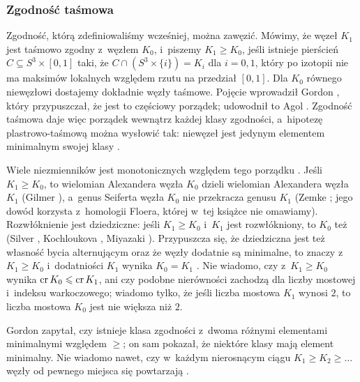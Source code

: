 \subsubsection{Zgodność taśmowa}
Zgodność, którą zdefiniowaliśmy wcześniej, można zawęzić.
Mówimy, że węzeł $K_1$ jest taśmowo zgodny z~węzłem $K_0$, i~piszemy $K_1 \geq K_0$, jeśli istnieje pierścień $C \subseteq S^3 \times [0, 1]$ taki, że $C \cap (S^3 \times \{i\}) = K_i$ dla $i = 0, 1$, który po izotopii nie ma maksimów lokalnych względem rzutu na przedział $[0, 1]$.
%
Dla $K_0$ równego niewęzłowi dostajemy dokładnie węzły taśmowe.
Pojęcie wprowadził Gordon \cite{gordon1981}, który przypuszczał, że jest to częściowy porządek; udowodnił to Agol \cite{agol2022}.
%
%
Zgodność taśmowa daje więc porządek wewnątrz każdej klasy zgodności, a~hipotezę plastrowo-taśmową można wysłowić tak: niewęzeł jest jedynym elementem minimalnym swojej klasy \cite[problem 1.54]{baykur2026}.

Wiele niezmienników jest monotonicznych względem tego porządku \cite[problem 1.53]{baykur2026}.
Jeśli $K_1 \geq K_0$, to wielomian Alexandera węzła $K_0$ dzieli wielomian Alexandera węzła $K_1$ (Gilmer \cite{gilmer1984}), a~genus Seiferta węzła $K_0$ nie przekracza genusu $K_1$ (Zemke \cite{zemke2019}; jego dowód korzysta z~homologii Floera, której w~tej książce nie omawiamy).
%
%
Rozwłóknienie jest dziedziczne: jeśli $K_1 \geq K_0$ i~$K_1$ jest rozwłókniony, to $K_0$ też (Silver \cite{silver1992}, Kochloukova \cite{kochloukova2006}, Miyazaki \cite{miyazaki2018}).
%
%
Przypuszcza się, że dziedziczna jest też własność bycia alternującym oraz że węzły dodatnie są minimalne, to znaczy z~$K_1 \geq K_0$ i~dodatniości $K_1$ wynika $K_0 = K_1$ \cite[problem 1.53]{baykur2026}.
Nie wiadomo, czy z~$K_1 \geq K_0$ wynika $\operatorname{cr} K_0 \leqslant \operatorname{cr} K_1$, ani czy podobne nierówności zachodzą dla liczby mostowej i~indeksu warkoczowego; wiadomo tylko, że jeśli liczba mostowa $K_1$ wynosi $2$, to liczba mostowa $K_0$ jest nie większa niż $2$.

Gordon \cite{gordon1981} zapytał, czy istnieje klasa zgodności z~dwoma różnymi elementami minimalnymi względem $\geq$; on sam pokazał, że niektóre klasy mają element minimalny.
Nie wiadomo nawet, czy w~każdym nierosnącym ciągu $K_1 \geq K_2 \geq \ldots$ węzły od pewnego miejsca się powtarzają \cite[problem 1.56]{baykur2026}.
